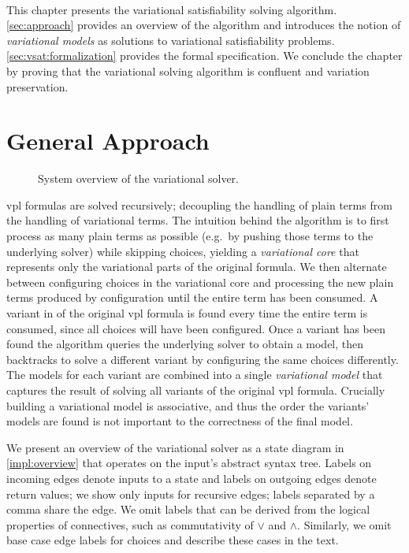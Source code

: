 ~\label{chapter:vsat}

This chapter presents the variational satisfiability solving algorithm.
\autoref{sec:approach} provides an overview of the algorithm and introduces the
notion of \emph{variational models} as solutions to variational satisfiability
problems. \autoref{sec:vsat:formalization} provides the formal specification.
We conclude the
chapter by proving that the variational solving algorithm is confluent and
variation preservation.


\section{General Approach}
\label{sec:approach}

\begin{figure}
  \centering
    
    \caption{System overview of the variational solver.}%
    \label{impl:overview}
\end{figure}

\ac{vpl} formulas are solved recursively; decoupling the handling of plain terms
from the handling of variational terms.
%
The intuition behind the algorithm is to first process as many plain terms as
possible (e.g.\ by pushing those terms to the underlying solver) while skipping
choices, yielding a \emph{variational core} that represents only the variational
parts of the original formula. We then alternate between configuring choices in
the variational core and processing the new plain terms produced by
configuration until the entire term has been consumed.
%
A variant in of the original \ac{vpl} formula is found every time the entire
term is consumed, since all choices will have been configured. Once a variant
has been found the algorithm queries the underlying solver to obtain a model,
then backtracks to solve a different variant by configuring the same choices
differently. The models for each variant are combined into a single
\emph{variational model} that captures the result of solving all variants of the
original \ac{vpl} formula. Crucially building a variational model is
associative, and thus the order the variants' models are found is not important
to the correctness of the final model.

We present an overview of the variational solver as a state diagram in
\autoref{impl:overview} that operates on the input's abstract syntax tree.
Labels on incoming edges denote inputs to a state and labels on outgoing edges
denote return values; we show only inputs for recursive edges; labels separated
by a comma share the edge. We omit labels that can be derived from the logical
properties of connectives, such as commutativity of $\vee$ and $\wedge$.
Similarly, we omit base case edge labels for choices and describe these cases
in the text.

